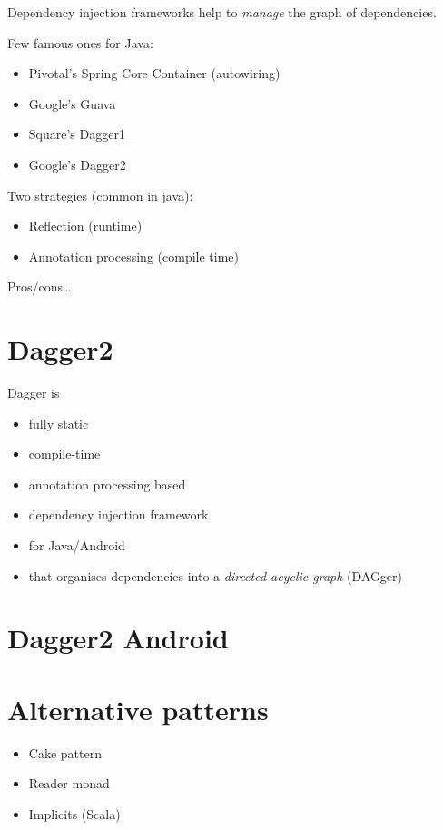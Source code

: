 \documentclass[10pt]{beamer}
\begin{document}
\begin{frame}
	Dependency injection frameworks help to \emph{manage} the graph of dependencies. 

	Few famous ones for Java:
	\begin{itemize}
		\item Pivotal's Spring Core Container (autowiring) 
		\item Google's Guava 
		\item Square's Dagger1
		\item Google's Dagger2
	\end{itemize}
\end{frame}

\begin{frame}
	Two strategies (common in java):
	\begin{itemize}
		\item Reflection (runtime) 
		\item Annotation processing (compile time)
	\end{itemize}

	Pros/cons\ldots 
\end{frame}

	\section{Dagger2}
	\begin{frame}
		Dagger is
		\begin{itemize}
			\item fully static 
			\item compile-time 
			\item annotation processing based 
			\item dependency injection framework
			\item for Java/Android
			\item that organises dependencies into a \emph{directed acyclic graph
				}	(DAGger)
		\end{itemize}
	\end{frame}
	\section{Dagger2 Android }
	\section{Alternative patterns}
	\begin{frame}[fragile]
		\begin{itemize}
			\item Cake pattern
			\item Reader monad 
			\item Implicits (Scala)
		\end{itemize}
	\end{frame}

% 
% 
\end{document}
